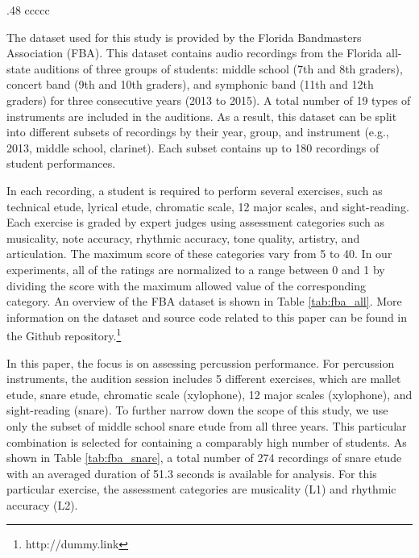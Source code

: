 \documentclass{article}
\begin{document}
\begin{table}
\begin{tabularx}{.48 \textwidth}{ccccc}
 \\ \hline
\end{tabularx}
\caption{An overview of numbers of student recordings in FBA dataset from 2013 to 2015}
\label{tab:fba_all}
\end{table}


The dataset used for this study is provided by the Florida Bandmasters Association (FBA). This dataset contains audio recordings from the Florida all-state auditions of three groups of students: middle school (7th and 8th graders), concert band (9th and 10th graders), and symphonic band (11th and 12th graders) for three consecutive years (2013 to 2015). A total number of 19 types of instruments are included in the auditions. As a result, this dataset can be split into different subsets of recordings by their year, group, and instrument (e.g., 2013, middle school, clarinet). Each subset contains up to 180 recordings of student performances.  

In each recording, a student is required to perform several exercises, such as technical etude, lyrical etude, chromatic scale, 12 major scales, and sight-reading. Each exercise is graded by expert judges using assessment categories such as musicality, note accuracy, rhythmic accuracy, tone quality, artistry, and articulation. The maximum score of these categories vary from 5 to 40. In our experiments, all of the ratings are normalized to a range between 0 and 1 by dividing the score with the maximum allowed value of the corresponding category. An overview of the FBA dataset is shown in Table \ref{tab:fba_all}. More information on the dataset and source code related to this paper can be found in the Github repository.\footnote{http://dummy.link}  

In this paper, the focus is on assessing percussion performance. For percussion instruments, the audition session includes 5 different exercises, which are mallet etude, snare etude, chromatic scale (xylophone), 12 major scales (xylophone), and sight-reading (snare). To further narrow down the scope of this study, we use only the subset of middle school snare etude from all three years. This particular combination is selected for containing a comparably high number of students. As shown in Table \ref{tab:fba_snare}, a total number of 274 recordings of snare etude with an averaged duration of 51.3 seconds is available for analysis. For this particular exercise, the assessment categories are musicality (L1) and rhythmic accuracy (L2).
\end{document}
